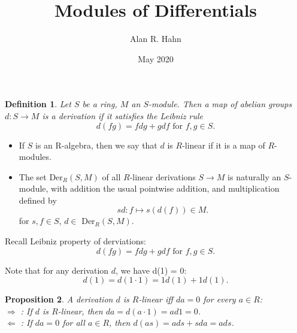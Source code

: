 \documentclass{beamer}
\title[Modules of Differentials]{Modules of Differentials}
\author{Alan R. Hahn}
\institute{TU Kaiserslautern}
\date{May 2020}
\newtheorem{prop}{Proposition}
\newtheorem{defn}[prop]{Definition}
\newtheorem{n}{Note}
\begin{document}
\begin{frame}
  \titlepage
\end{frame}


\begin{frame}
\begin{small}
\begin{defn}
Let $S$ be a ring, $M$ an $S$-module. Then a map of abelian groups $d:S\to M$ is a derivation if it satisfies the Leibniz rule
$$d(fg) = fdg+gdf\text{   for }f,g\in S.$$
\end{defn}

\begin{itemize}
\item If $S$ is an R-algebra, then we say that $d$ is $R$-linear if it is a map of $R$-modules. 
\item The set Der$_R(S,M)$ of all $R$-linear derivations $S\to M$ is naturally an $S$-module, with addition the usual pointwise addition, and multiplication defined by 
$$sd:f\mapsto s(d(f))\in M.$$
for $s,f\in S$, $d\in$ Der$_R(S,M)$.
\end{itemize}
\end{small}
\end{frame}


\begin{frame}
\begin{small}

Recall Leibniz property of derviations: 
$$d(fg) = fdg+gdf\text{   for }f,g\in S.$$

Note that for any derivation $d$, we have d(1) = 0:
$$d(1) = d(1\cdot 1) = 1d(1)+1d(1).$$

\begin{prop}
A derivation $d$ is $R$-linear iff $da = 0$ for every $a\in R$:
\\$\Rightarrow$ : If $d$ is $R$-linear, then $da = d(a\cdot 1) = ad1 = 0$.
\\$\Leftarrow$ : If $da = 0$ for all $a\in R$, then $d(as) = ads+sda = ads$.
\end{prop}


\end{small}
\end{frame}

\end{document}
